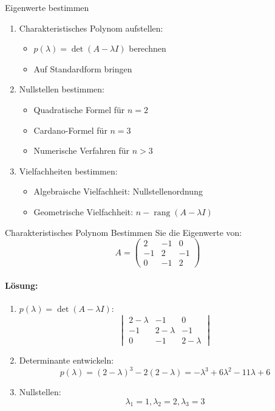 \begin{KR}{Eigenwerte bestimmen}
\begin{enumerate}
    \item Charakteristisches Polynom aufstellen:
    \begin{itemize}
        \item $p(\lambda) = \det(A-\lambda I)$ berechnen
        \item Auf Standardform bringen
    \end{itemize}
    
    \item Nullstellen bestimmen:
    \begin{itemize}
        \item Quadratische Formel für $n=2$
        \item Cardano-Formel für $n=3$
        \item Numerische Verfahren für $n>3$
    \end{itemize}
    
    \item Vielfachheiten bestimmen:
    \begin{itemize}
        \item Algebraische Vielfachheit: Nullstellenordnung
        \item Geometrische Vielfachheit: $n-\operatorname{rang}(A-\lambda I)$
    \end{itemize}
\end{enumerate}
\end{KR}

\begin{example2}{Charakteristisches Polynom}
Bestimmen Sie die Eigenwerte von:
$$A = \begin{pmatrix}
2 & -1 & 0 \\
-1 & 2 & -1 \\
0 & -1 & 2
\end{pmatrix}$$

\paragraph{Lösung:}
\begin{enumerate}
    \item $p(\lambda) = \det(A-\lambda I)$:
    $$\begin{vmatrix}
    2-\lambda & -1 & 0 \\
    -1 & 2-\lambda & -1 \\
    0 & -1 & 2-\lambda
    \end{vmatrix}$$
    
    \item Determinante entwickeln:
    $$p(\lambda) = (2-\lambda)^3 - 2(2-\lambda) = -\lambda^3 + 6\lambda^2 - 11\lambda + 6$$
    
    \item Nullstellen:
    $$\lambda_1 = 1, \lambda_2 = 2, \lambda_3 = 3$$
\end{enumerate}
\end{example2}

